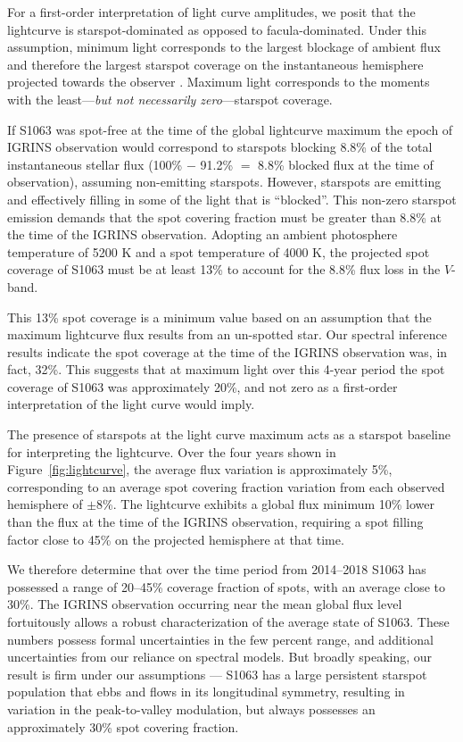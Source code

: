 \documentclass[trackchanges]{aastex631}
\begin{document}
For a first-order interpretation of light curve amplitudes, we posit that the lightcurve is starspot-dominated as opposed to facula-dominated.  Under this assumption, minimum light corresponds to the largest blockage of ambient flux and therefore the largest starspot coverage on the instantaneous hemisphere projected towards the observer \cite{basri18}.  Maximum light corresponds to the moments with the least---\emph{but not necessarily zero}---starspot coverage.

If S1063 was spot-free at the time of the global lightcurve maximum the epoch of IGRINS observation would correspond to starspots blocking 8.8\% of the total instantaneous stellar flux (100\% $-$ 91.2\% $=$ 8.8\% blocked flux at the time of observation), assuming non-emitting starspots. However, starspots are emitting and effectively filling in some of the light that is ``blocked''.  This non-zero starspot emission demands that the spot covering fraction must be greater than 8.8\% at the time of the IGRINS observation. Adopting an ambient photosphere temperature of 5200 K and a spot temperature of 4000 K, the projected spot coverage of S1063 must be at least 13\% to account for the 8.8\% flux loss in the $V$-band.

This 13\% spot coverage is a minimum value based on an assumption that the maximum lightcurve flux results from an un-spotted star. Our spectral inference results indicate the spot coverage at the time of the IGRINS observation was, in fact, 32\%. This suggests that at maximum light over this 4-year period the spot coverage of S1063 was approximately 20\%, and not zero as a first-order interpretation of the light curve would imply.

The presence of starspots at the light curve maximum acts as a starspot baseline for interpreting the lightcurve. Over the four years shown in Figure~\ref{fig:lightcurve}, the average flux variation is approximately 5\%, corresponding to an average spot covering fraction variation from each observed hemisphere of $\pm$8\%. The lightcurve exhibits a global flux minimum 10\% lower than the flux at the time of the IGRINS observation, requiring a spot filling factor close to 45\% on the projected hemisphere at that time.

We therefore determine that over the time period from 2014--2018 S1063 has possessed a range of 20--45\% coverage fraction of spots, with an average close to 30\%. The IGRINS observation occurring near the mean global flux level fortuitously allows a robust characterization of the average state of S1063. These numbers possess formal uncertainties in the few percent range, and additional uncertainties from our reliance on spectral models.  But broadly speaking, our result is firm under our assumptions --- S1063 has a large persistent starspot population that ebbs and flows in its longitudinal symmetry, resulting in variation in the peak-to-valley modulation, but always possesses an approximately 30\% spot covering fraction.
\end{document}
